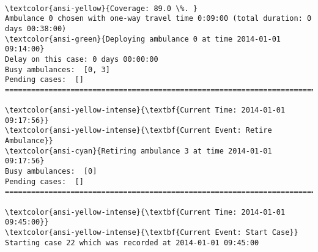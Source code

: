\documentclass[11pt]{article}
\begin{document}
    \begin{center}
    \end{center}
    { \hspace*{\fill} \\}
    
    \begin{Verbatim}[commandchars=\\\{\}]
\textcolor{ansi-yellow}{Coverage: 89.0 \%. }
Ambulance 0 chosen with one-way travel time 0:09:00 (total duration: 0 days 00:38:00)
\textcolor{ansi-green}{Deploying ambulance 0 at time 2014-01-01 09:14:00}
Delay on this case: 0 days 00:00:00
Busy ambulances:  [0, 3]
Pending cases:  []
========================================================================

\textcolor{ansi-yellow-intense}{\textbf{Current Time: 2014-01-01 09:17:56}}
\textcolor{ansi-yellow-intense}{\textbf{Current Event: Retire Ambulance}}
\textcolor{ansi-cyan}{Retiring ambulance 3 at time 2014-01-01 09:17:56}
Busy ambulances:  [0]
Pending cases:  []
========================================================================

\textcolor{ansi-yellow-intense}{\textbf{Current Time: 2014-01-01 09:45:00}}
\textcolor{ansi-yellow-intense}{\textbf{Current Event: Start Case}}
Starting case 22 which was recorded at 2014-01-01 09:45:00

    \end{Verbatim}

    \begin{center}
    \end{center}
    { \hspace*{\fill} \\}
    
\end{document}
